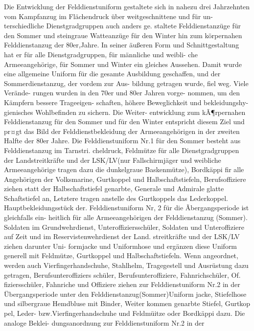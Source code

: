 

Die Entwicklung der Felddienstuniform gestaltete
sich in nahezu drei Jahrzehnten vom Kampfanzug
im Flächendruck über weitgeschnittene und für un-
terschiedliche Dienstgradgruppen auch anders ge.
staltete Felddienstanzüge für den Sommer und
steingraue Watteanzüge für den Winter hin zum
körpernahen Felddienstanzug der 80er,Jahre. In seiner äußeren Form und Schnittgestaltung hat er für
alle Dienstgradgruppen, für männliche und weibli-
che Armeeangehörige, für Sommer und Winter ein
gleiches Aussehen. Damit wurde eine allgemeine
Uniform für die gesamte Ausbildung geschaffen,
und der Sommerdienstanzug, der vordem zur Aus-
bildung getragen wurde, fiel weg. Viele Verände-
rungen wurden in den 70er und 80er Jahren vorge-
nommen, um den Kämpfern bessere Trageeigen-
schaften, höhere Beweglichkeit und bekleidungshy-
gienisches Wohlbefinden zu sichern. Die Weiter-
entwicklung zum kÃ¶rpernahen Felddienstanzug für
den Sommer und für den Winter entspricht diesem
Ziel und pr¤gt das Bild der Felddienstbekleidung
der Armeeangehörigen in der zweiten Halfte der
80er Jahre. Die Felddienstuniform Nr.1 für den
Sommer besteht aus Felddienstanzug im Tarnstri.
cheldruck, Feldmütze für alle Dienstgradgruppen
der Landstreitkräfte und der LSK/LV(nur Fallschirmjäger und weibliche Armeeangehörige tragen
dazu die dunkelgraue Baskenmütze), Bordkäppi fir
alle Angehörigen der Volksmarine, Gurtkoppel und
Halbschaftstiefeln, Berufsoffiziere ziehen statt der
Halbschaftstiefel genarbte, Generale und Admirale
glatte Schaftstiefel an, Letztere tragen anstelle des
Gurtkoppels das Lederkoppel.
Hauptbekleidungsstück der. Felddienstuniform
Nr, 2 für die Ãbergangsperiode ist gleichfalls ein-
heitlich für alle Armeeangehörigen der Felddienstanzug
(Sommer). Soldaten im Grundwehrdienst,
Unteroffiziersschüler, Soldaten und Unteroffiziere
auf Zeit und im Reservistenwehrdienst der Land.
streitkräfte und der LSK/LV ziehen darunter Uni-
formjacke und Uniformhose und ergänzen diese
Uniform generell mit Feldmütze, Gurtkoppel und
Halbschaftstiefeln. Wenn angeordnet, werden auch
Vierfingerhandschuhe, Stahlhelm, Tragegestell und
Ausrüstung dazu getragen, Berufsunteroffiziers
schüler, Berufsunteroffiziere, Fahnrichschüler, Of.
fiziersschüler, Fahnriche und Offiziere ziehen zur
Felddienstuniform Nr.2 in der Übergangsperiode
unter den Felddienstanzug(Sommer)Uniform
jacke, Stiefelhose und silbergraue Hemdbluse mit
Binder, Weiter kommen genarbte Stiefel, Gurtkop
pel, Leder- bzw.Vierfingerhandschuhe und Feldmüitze oder Bordkäppi dazu. Die analoge Beklei-
dungsanordnung zur Felddienstuniform Nr.2 in der

